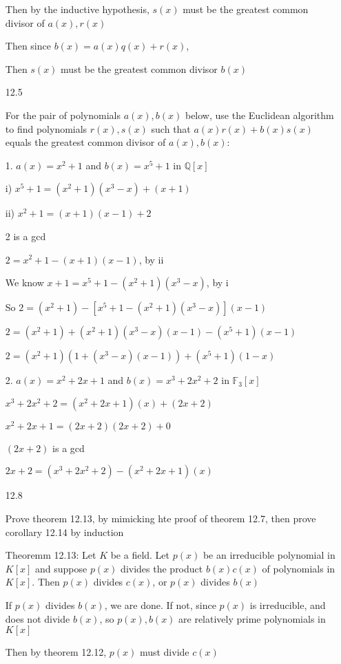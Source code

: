 \documentclass[12pt]{article}
\begin{document}
\begin{itemize}
Then by the inductive hypothesis, $s(x)$ must be the greatest common divisor of $a(x),r(x)$

Then since $b(x) = a(x)q(x) + r(x)$,

Then $s(x)$ must be the greatest common divisor $b(x)$

\newpage
\item[12.5]

For the pair of polynomials $a(x), b(x)$ below, use the Euclidean algorithm to find polynomials $r(x), s(x)$ such that $a(x)r(x) + b(x)s(x)$ equals the greatest common divisor of $a(x), b(x)$:

1. $a(x) = x^2 + 1$ and $b(x) = x^5 + 1$ in $\mathbb{Q}[x]$

\indent i) $x^5 + 1 = (x^2 + 1)(x^3 - x) + (x+1)$

\indent ii) $x^2 + 1 = (x+1)(x-1)+2$

2 is a gcd

$2=x^2 + 1 - (x+1)(x-1)$, by ii

We know $x+1 = x^5 + 1 - (x^2+1)(x^3-x)$, by i

So $2=(x^2+1) - [x^5+1-(x^2+1)(x^3-x)](x-1)$

$2=(x^2+1)+(x^2+1)(x^3-x)(x-1) - (x^5+1)(x-1)$

$2=(x^2+1)(1+(x^3-x)(x-1)) + (x^5+1)(1-x)$

\vfill

2. $a(x) = x^2 + 2x + 1$ and $b(x) = x^3 + 2x^2 + 2$ in $\mathbb{F}_3[x]$

$x^3 + 2x^2 + 2 = (x^2 + 2x + 1)(x) + (2x+2)$

$x^2+2x+1 = (2x+2)(2x+2) + 0$

$(2x+2)$ is a gcd

$2x+2 = (x^3+2x^2+2) - (x^2 + 2x + 1)(x)$

\vfill

\newpage
\item[12.8]

Prove theorem 12.13, by mimicking hte proof of theorem 12.7, then prove corollary 12.14 by induction

Theoremm 12.13: Let $K$ be a field. Let $p(x)$ be an irreducible polynomial in $K[x]$ and suppose $p(x)$ divides the product $b(x)c(x)$ of polynomials in $K[x]$. Then $p(x)$ divides $c(x)$, or $p(x)$ divides $b(x)$

If $p(x)$ divides $b(x)$, we are done. If not, since $p(x)$ is irreducible, and does not divide $b(x)$, so $p(x), b(x)$ are relatively prime polynomials in $K[x]$

Then by theorem 12.12, $p(x)$ must divide $c(x)$


\end{itemize}
\end{document}
